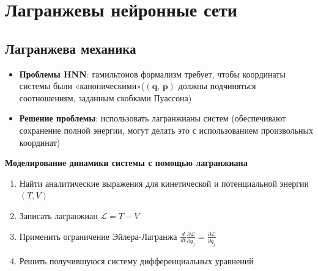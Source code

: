 \documentclass[12pt]{article}
\begin{document}
	
	\section{Лагранжевы нейронные сети}
	\subsection{Лагранжева механика}
	\begin{itemize}
		\item \textbf{Проблемы HNN}: гамильтонов формализм требует, чтобы координаты системы были «каноническими»($(\textbf{q, p})$ должны подчиняться соотношениям, заданным скобками Пуассона) %
		\item \textbf{Решение проблемы}: использовать лагранжианы систем (обеспечивают сохранение полной энергии, могут делать это с использованием произвольных координат)
	\end{itemize}
	
	\textbf{Моделирование динамики системы с помощью лагранжиана}
		\begin{enumerate}
			\item Найти аналитические выражения для кинетической и потенциальной энергии $(T, V )$
			\item Записать лагранжиан $\mathcal{L} = T - V $
			\item Применить ограничение Эйлера-Лагранжа $\frac{d}{d t} \frac{\partial \mathcal{L}}{\partial \dot{q}_{j}} =\frac{\partial \mathcal{L}}{\partial q_{j}} $
			\item Решить получившуюся систему дифференциальных уравнений
		\end{enumerate}

	
\end{document}
